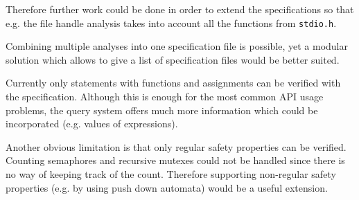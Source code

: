 Therefore further work could be done in order to extend the specifications so that e.g. the file handle analysis takes into account all the functions from \verb|stdio.h|.

Combining multiple analyses into one specification file is possible, yet a modular solution which allows to give a list of specification files would be better suited.

Currently only statements with functions and assignments can be verified with the specification. Although this is enough for the most common API usage problems, the query system offers much more information which could be incorporated (e.g. values of expressions).

Another obvious limitation is that only regular safety properties can be verified. Counting semaphores and recursive mutexes could not be handled since there is no way of keeping track of the count. Therefore supporting non-regular safety properties (e.g. by using push down automata) would be a useful extension.